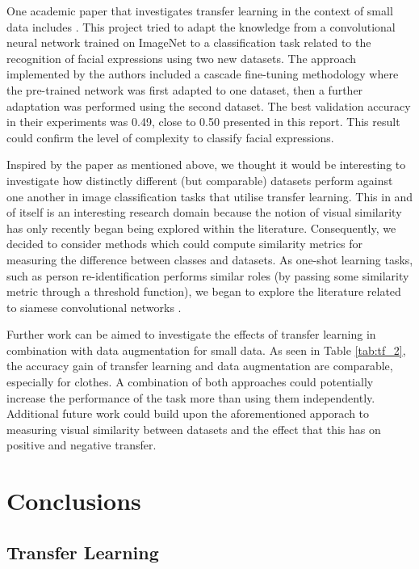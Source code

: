 \documentclass{article}
\begin{document}
One academic paper that investigates transfer learning in the context of small data includes \citep{ng2015deep}. This project tried to adapt the knowledge from a convolutional neural network trained on ImageNet to a classification task related to the recognition of facial expressions using two new datasets. The approach implemented by the authors included a cascade fine-tuning methodology where the pre-trained network was first adapted to one dataset, then a further adaptation was performed using the second dataset. The best validation accuracy in their experiments was 0.49, close to 0.50 presented in this report. This result could confirm the level of complexity to classify facial expressions.

Inspired by the paper as mentioned above, we thought it would be interesting to investigate how distinctly different (but comparable) datasets perform against one another in image classification tasks that utilise transfer learning. This in and of itself is an interesting research domain because the notion of visual similarity has only recently began being explored within the literature. Consequently, we decided to consider methods which could compute similarity metrics for measuring the difference between classes and datasets. As one-shot learning tasks, such as person re-identification \cite{ahmed2015improved} performs similar roles (by passing some similarity metric through a threshold function), we began to explore the literature related to siamese convolutional networks \cite{koch}.

Further work can be aimed to investigate the effects of transfer learning in combination with data augmentation for small data. As seen in Table \ref{tab:tf_2}, the accuracy gain of transfer learning and data augmentation are comparable, especially for clothes. A combination of both approaches could potentially increase the performance of the task more than using them independently. Additional future work could build upon the aforementioned apporach to measuring visual similarity between datasets and the effect that this has on positive and negative transfer.

\section{Conclusions}
\label{sec:conclusions}

\subsection{Transfer Learning}
\end{document}
